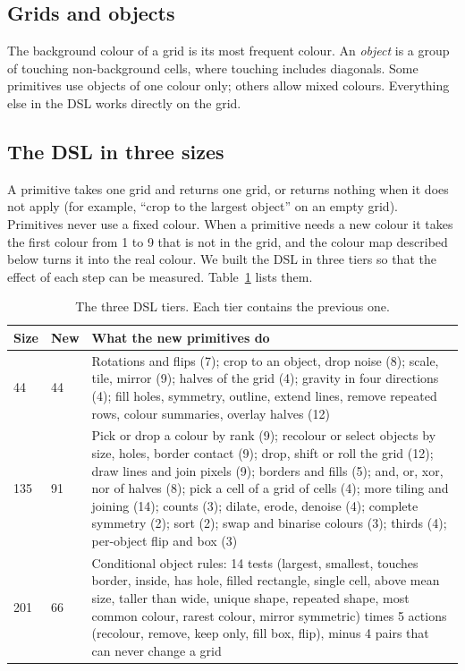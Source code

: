 \documentclass[sigconf,nonacm]{acmart}
\begin{document}
\subsection{Grids and objects}

The background colour of a grid is its most frequent colour. An \emph{object} is a group of touching non-background cells, where touching includes diagonals. Some primitives use objects of one colour only; others allow mixed colours. Everything else in the DSL works directly on the grid.

\subsection{The DSL in three sizes}

A primitive takes one grid and returns one grid, or returns nothing when it does not apply (for example, ``crop to the largest object'' on an empty grid). Primitives never use a fixed colour. When a primitive needs a new colour it takes the first colour from 1 to 9 that is not in the grid, and the colour map described below turns it into the real colour. We built the DSL in three tiers so that the effect of each step can be measured. Table~\ref{tab:dsl} lists them.

\begin{table}[t]
\caption{The three DSL tiers. Each tier contains the previous one.}
\label{tab:dsl}
\small
\begin{tabular}{@{}p{0.6cm}p{0.9cm}p{5.2cm}@{}}
\toprule
Size & New & What the new primitives do \\
\midrule
44 & 44 & Rotations and flips (7); crop to an object, drop noise (8); scale, tile, mirror (9); halves of the grid (4); gravity in four directions (4); fill holes, symmetry, outline, extend lines, remove repeated rows, colour summaries, overlay halves (12) \\
135 & 91 & Pick or drop a colour by rank (9); recolour or select objects by size, holes, border contact (9); drop, shift or roll the grid (12); draw lines and join pixels (9); borders and fills (5); and, or, xor, nor of halves (8); pick a cell of a grid of cells (4); more tiling and joining (14); counts (3); dilate, erode, denoise (4); complete symmetry (2); sort (2); swap and binarise colours (3); thirds (4); per-object flip and box (3) \\
201 & 66 & Conditional object rules: 14 tests (largest, smallest, touches border, inside, has hole, filled rectangle, single cell, above mean size, taller than wide, unique shape, repeated shape, most common colour, rarest colour, mirror symmetric) times 5 actions (recolour, remove, keep only, fill box, flip), minus 4 pairs that can never change a grid \\
\bottomrule
\end{tabular}
\end{table}
\end{document}

